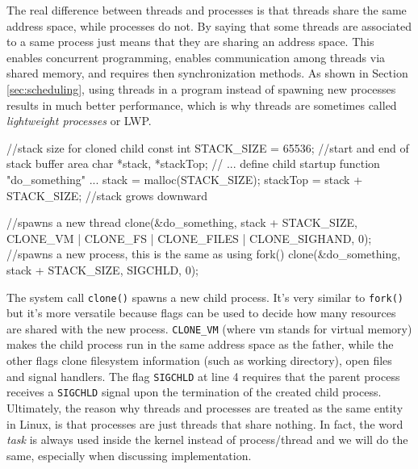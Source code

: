 The real difference between threads and processes is that threads share the same address space, while processes do not. By saying that some threads are associated to a same process just means that they are sharing an address space. This enables concurrent programming, enables communication among threads via shared memory, and requires then synchronization methods. As shown in Section \ref{sec:scheduling},
using threads in a program instead of spawning new processes results in much better performance, which is why threads are sometimes called \textit{lightweight processes} or LWP.
\begin{code}
//stack size for cloned child
const int STACK_SIZE = 65536;
//start and end of stack buffer area
char *stack, *stackTop;
// ... define child startup function "do_something" ...
stack = malloc(STACK_SIZE);
stackTop = stack + STACK_SIZE; //stack grows downward

//spawns a new thread
clone(&do_something, stack + STACK_SIZE, CLONE_VM | CLONE_FS | CLONE_FILES | CLONE_SIGHAND, 0); 
//spawns a new process, this is the same as using fork()
clone(&do_something, stack + STACK_SIZE, SIGCHLD, 0); 
\end{code}
The system call \verb|clone()| spawns a new child process. It's very
similar to \verb|fork()| but it's more versatile because flags can be
used to decide how many resources are shared with the new
process. \verb|CLONE_VM| (where vm stands for virtual memory) makes
the child process run in the same address space as the father, while
the other flags clone filesystem information (such as working
directory), open files and signal handlers. The flag \verb|SIGCHLD| at
line 4 requires that the parent process receives a \texttt{SIGCHLD}
signal upon the termination of the created child process.  Ultimately,
the reason why threads and processes are treated as the same entity in
Linux, is that processes are just threads that share nothing. In fact,
the word \textit{task} is always used inside the kernel instead of
process/thread and we will do the same, especially when discussing
implementation.

